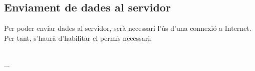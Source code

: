 	\subsection{Enviament de dades al servidor}
		Per poder enviar dades al servidor, serà necessari l'ús d'una connexió a Internet. Per tant, s'haurà d'habilitar el permís necessari.\\\\
		\begin{java}
...
		\end{java}
